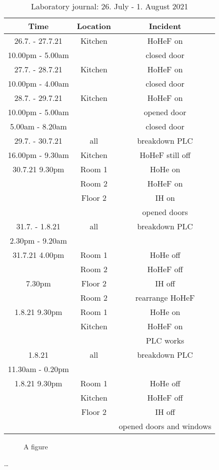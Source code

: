 \begin{table}[H]
    \centering
    \begin{tabular}{c|c|c}
        \textbf{Time} & \textbf{Location} & \textbf{Incident}\\
        \hline
        \hline
        26.7. - 27.7.21 & Kitchen & HoHeF on\\
        10.00pm - 5.00am & & closed door\\
        \hline
        27.7. - 28.7.21 & Kitchen & HoHeF on\\
        10.00pm - 4.00am & & closed door\\
        \hline
        28.7. - 29.7.21 & Kitchen & HoHeF on\\
        10.00pm - 5.00am & & opened door\\
        5.00am - 8.20am & & closed door\\
        \hline
        29.7. - 30.7.21 & all & breakdown PLC\\
        16.00pm - 9.30am & Kitchen & HoHeF still off\\
        \hline
        30.7.21 9.30pm & Room 1 & HoHe on\\
        & Room 2 & HoHeF on\\
        & Floor 2 & IH on\\
        && opened doors\\
        \hline
        31.7. - 1.8.21 & all & breakdown PLC\\
        2.30pm - 9.20am &&\\
        \hline
        31.7.21 4.00pm & Room 1 & HoHe off\\
        & Room 2 & HoHeF off\\
        7.30pm & Floor 2 & IH off\\
         & Room 2 & rearrange HoHeF \\
        \hline
        1.8.21 9.30pm & Room 1 & HoHe on\\
        & Kitchen & HoHeF on\\
       && PLC works\\
       \hline
        1.8.21 & all & breakdown PLC\\
        11.30am - 0.20pm &&\\
        \hline
        1.8.21 9.30pm & Room 1 & HoHe off\\
        & Kitchen & HoHeF off\\
        & Floor 2 & IH off\\
        && opened doors and windows\\
    \end{tabular}
    \caption{Laboratory journal: 26. July - 1. August 2021}
    \label{tab:Experiment2app}
\end{table}

\setcounter{figure}{0}
		
\begin{figure} [ht]
  \centering
  \caption{A figure}
  \label{fig:anotherfigure}
\end{figure}


\dots